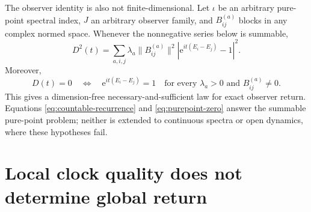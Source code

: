 \documentclass[10pt]{article}
\theoremstyle{definition}
\newcommand{\ee}{\mathrm e}
\begin{document}
The observer identity is also not finite-dimensional.  Let \(\iota\) be an
arbitrary pure-point spectral index, \(J\) an arbitrary observer family, and
\(B^{(a)}_{ij}\) blocks in any complex normed space.  Whenever the nonnegative
series below is summable,
\begin{equation}
 D^2(t)=\sum_{a,i,j}\lambda_a\|B^{(a)}_{ij}\|^2
  \left|\ee^{it(E_i-E_j)}-1\right|^2.
\label{eq:purepoint}
\end{equation}
Moreover,
\begin{equation}
 D(t)=0
 \quad\Longleftrightarrow\quad
 \ee^{it(E_i-E_j)}=1
\quad\text{for every }\lambda_a>0\text{ and }B^{(a)}_{ij}\ne0.
\label{eq:purepoint-zero}
\end{equation}
This gives a dimension-free necessary-and-sufficient law for exact observer
return.  Equations \eqref{eq:countable-recurrence} and
\eqref{eq:purepoint-zero} answer the summable pure-point problem; neither is
extended to continuous spectra or open dynamics, where these hypotheses fail.

\section*{Local clock quality does not determine global return}
\end{document}
